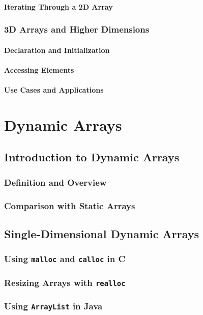 \documentclass[12pt, oneside]{book}
\begin{document}
	\subsubsection{Iterating Through a 2D Array}
	\subsection{3D Arrays and Higher Dimensions}
	\subsubsection{Declaration and Initialization}
	\subsubsection{Accessing Elements}
	\subsubsection{Use Cases and Applications}
\chapter{Dynamic Arrays}
	\section{Introduction to Dynamic Arrays}
	\subsection{Definition and Overview}
	\subsection{Comparison with Static Arrays}
	
	\section{Single-Dimensional Dynamic Arrays}
	\subsection{Using \texttt{malloc} and \texttt{calloc} in C}
	\subsection{Resizing Arrays with \texttt{realloc}}
	\subsection{Using \texttt{ArrayList} in Java}
\end{document}
